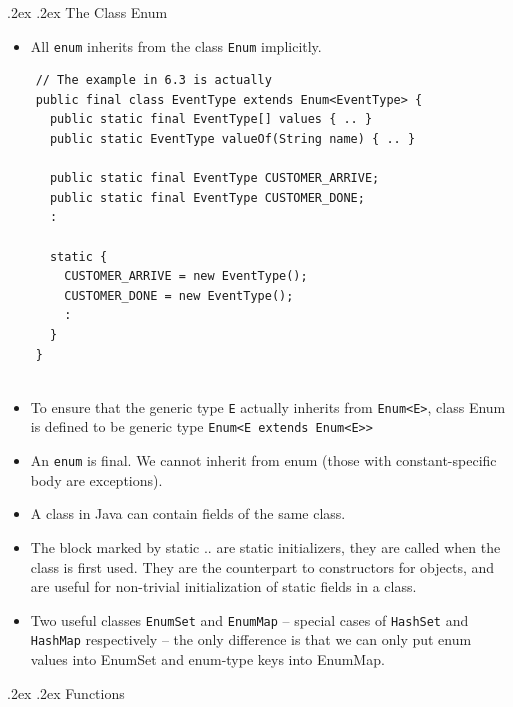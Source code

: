 \documentclass[10pt,landscape,a4paper]{article}
\makeatletter
\renewcommand{\section}{\@startsection{section}{1}{0mm}%
                                {.2ex}%
                                {.2ex}%
                                {\color{myblue}\sffamily\small\bfseries}}
\renewcommand{\subsubsection}{\@startsection{subsubsection}{1}{0mm}%
                                {.2ex}%
                                {.2ex}%
                                {\rmfamily\bfseries}}
\makeatother
\begin{document}
\begin{multicols*}{3}
    \subsubsection{The Class Enum}
    \begin{itemize}
      \item All \texttt{enum} inherits from the class \texttt{Enum} implicitly.
    \end{itemize}
    \begin{verbatim}
    // The example in 6.3 is actually
    public final class EventType extends Enum<EventType> {
      public static final EventType[] values { .. }
      public static EventType valueOf(String name) { .. }
      
      public static final EventType CUSTOMER_ARRIVE;
      public static final EventType CUSTOMER_DONE;
      :
      
      static {
        CUSTOMER_ARRIVE = new EventType();
        CUSTOMER_DONE = new EventType();
        :
      }
    }
    
    \end{verbatim}
    
    \begin{itemize}
      \item To ensure that the generic type \texttt{E} actually inherits from \texttt{Enum<E>}, class Enum is defined to be generic type \texttt{Enum<E extends Enum<E>>}
      \item An \texttt{enum} is final. We cannot inherit from enum (those with constant-specific body are exceptions).
      \item A class in Java can contain fields of the same class.
      \item The block marked by static { .. } are static initializers, they are called when the class is first used. They are the counterpart to constructors for objects, and are useful for non-trivial initialization of static fields in a class.
      \item Two useful classes \texttt{EnumSet} and \texttt{EnumMap} -- special cases of \texttt{HashSet} and \texttt{HashMap} respectively -- the only difference is that we can only put enum values into EnumSet and enum-type keys into EnumMap. 
      
    \end{itemize}
    
   
    \section{Functions}

\end{multicols*}
\end{document}
